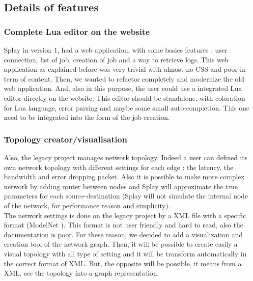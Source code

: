 \documentclass{eplmastersthesis}
\begin{document}


      \subsection{Details of features}  %

        \subsubsection{Complete Lua editor on the website}  %

        Splay in version 1, had a web application, with some basics features :
        user connection, list of job, creation of job and a way to retrieve
        logs. This web application as explained before was very trivial with
        almost no CSS and poor in term of content. Then, we wanted to refactor
        completely and modernize the old web application. And, also in this
        purpose, the user could use a integrated Lua editor directly on the
        website. This editor should be standalone, with coloration for Lua
        language, error parsing and maybe some small auto-completion. This one
        need to be integrated into the form of the job creation.

        \subsubsection{Topology creator/visualisation} %

        Also, the legacy project manages network topology. Indeed a user can
        defined its own network topology with different settings for each
        edge : the latency, the bandwidth and error dropping packet. Also it
        is possible to make more complex network by adding router between nodes
        and Splay will approximate the true parameters for each
        source-destination (Splay will not simulate the internal node of the
        network, for performance reason and simplicity). \\

        The network settings is done on the legacy project by a XML file with a
        specific format (ModelNet \cite{ModelNet}). This format is not user
        friendly and hard to read, also the documentation is poor. For these
        reason, we decided to add a visualization and creation tool of the
        network graph. Then, it will be possible to create easily a visual
        topology with all type of setting and it will be transform
        automatically in the correct format of XML. But, the opposite will be
        possible, it means from a XML, see the topology into a graph
        representation.
\end{document}
